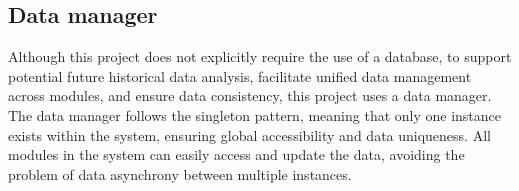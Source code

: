 \documentclass[
english,
ruledheaders=section,%
class=report,%
thesis={type=Report},%
accentcolor=9c,%
custommargins=true,%
marginpar=false,%
parskip=half-,%
fontsize=11pt,%
logofile={img/tuda_logo.pdf}, %
]{tudapub}
\begin{document}

    \subsection{Data manager}
    Although this project does not explicitly require the use of a database, to support potential future historical data analysis, facilitate unified data management across modules, and ensure data consistency, this project uses a data manager. The data manager follows the singleton pattern, meaning that only one instance exists within the system, ensuring global accessibility and data uniqueness. All modules in the system can easily access and update the data, avoiding the problem of data asynchrony between multiple instances.

\end{document}
